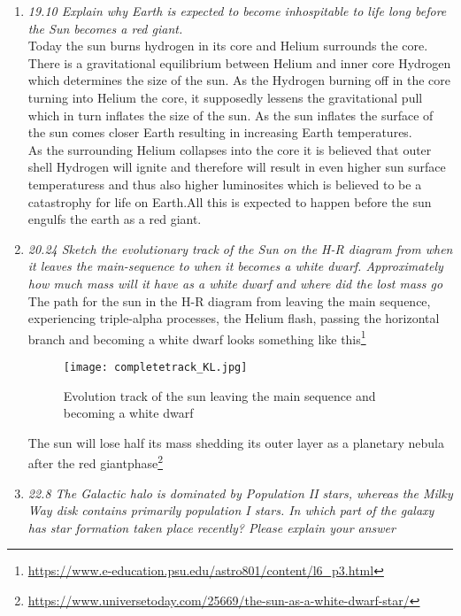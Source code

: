 \documentclass[./exercises.tex]{subfiles}
\begin{document}
\begin{enumerate}
\item\textit{19.10 Explain why Earth is expected to become inhospitable to life long before the Sun 
becomes a red giant.}\\

Today the sun burns hydrogen in its core and Helium surrounds the core. 
There is a gravitational equilibrium between Helium and inner core Hydrogen which determines the size of the sun.
As the Hydrogen burning off in the core turning into Helium the core, it supposedly lessens
the gravitational pull which in turn inflates the size of the sun.
 As the sun inflates the surface of the sun comes closer Earth
resulting in increasing Earth temperatures.\\
As the surrounding Helium collapses into the core it is
believed that outer shell Hydrogen will ignite and therefore will result in even higher
sun surface temperaturess and thus also higher luminosites
which is believed to be a catastrophy for life on Earth.All this is expected to happen
before the sun engulfs the earth as a red giant.


\item\textit{20.24 Sketch the evolutionary track of the Sun on the H-R diagram from when it leaves the 
main-sequence to when it becomes a white dwarf.  Approximately how much mass will it 
have as a white dwarf and where did the lost mass go}\\

The path for the sun in the H-R diagram from leaving the main sequence, experiencing 
triple-alpha processes, the Helium flash, passing the horizontal branch and becoming
a white dwarf looks something like this\footnote{\url{https://www.e-education.psu.edu/astro801/content/l6_p3.html}}
\begin{figure}[H]
  \centering
  \texttt{[image: completetrack\_KL.jpg]}
  \caption{Evolution track of the sun leaving the main sequence and becoming a white dwarf}
  \label{fig:fig4}
\end{figure}

The sun will lose half its mass
shedding its outer layer as a planetary nebula after the red giantphase\footnote{\url{https://www.universetoday.com/25669/the-sun-as-a-white-dwarf-star/}}


\item\textit{22.8 The Galactic halo is dominated by Population II stars, whereas the Milky Way disk
contains primarily population I stars. In which part of the galaxy has star formation taken
place recently? Please explain your answer}


\end{enumerate}
\end{document}
